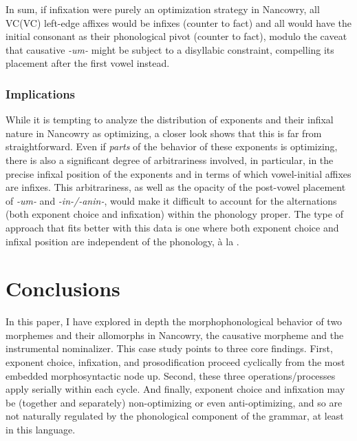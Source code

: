 \documentclass[output=paper]{langscibook}
\begin{document}
In sum, if infixation were purely an optimization strategy in Nancowry, all VC(VC) left-edge affixes would be infixes (counter to fact) and all would have the initial consonant as their phonological pivot (counter to fact), modulo the caveat that causative \textit{-um-} might be subject to a disyllabic constraint, compelling its placement after the first vowel instead.


\subsubsection{Implications}\label{sec:kalin:4.3.3}

While it is tempting to analyze the distribution of exponents and their infixal nature in Nancowry as optimizing, a closer look shows that this is far from straightforward. Even if {\it parts} of the behavior of these exponents is optimizing, there is also a significant degree of arbitrariness involved, in particular, in the precise infixal position of the exponents and in terms of which vowel-initial affixes are infixes. This arbitrariness, as well as the opacity of the post-vowel placement of \textit{-um-} and \textit{-in-/-anin-}, would make it difficult to account for the alternations (both exponent choice and infixation) within the phonology proper. The type of approach that fits better with this data is one where both exponent choice and infixal position are  independent of the phonology, \`a la \citet{Paster06,Yu07,KalinIP,Kalin20,KalinRolle21}.%

\section{Conclusions}\label{sec:kalin:5}

In this paper, I have explored in depth the morphophonological behavior of two morphemes and their allomorphs in Nancowry, the causative morpheme and the instrumental nominalizer. This case study points to three core findings. First, exponent choice, infixation, and prosodification proceed cyclically from the most embedded morphosyntactic node up. Second, these three operations/processes apply serially within each cycle. And finally, exponent choice and infixation may be (together and separately) non-optimizing or even anti-optimizing, and so are not naturally regulated by the phonological component of the grammar, at least in this language.
\end{document}
